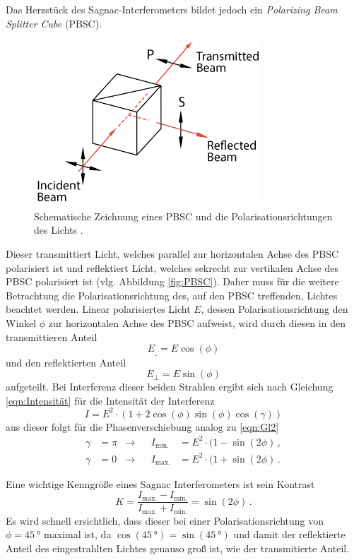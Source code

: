 Das Herzstück des Sagnac-Interferometers bildet jedoch ein \textit{Polarizing Beam Splitter Cube} (PBSC).
\begin{figure}
\includegraphics[width = .3\textwidth]{bilder/sketch-polarizing-cube-beamsplitter.png}
\caption{Schematische Zeichnung eines PBSC und die Polarisationsrichtungen des Lichts \cite{PBSC}.}
\end{figure}
Dieser transmittiert Licht, welches parallel zur horizontalen Achse des PBSC polarisiert ist und reflektiert Licht, welches sekrecht zur vertikalen Achse des PBSC polarisiert ist (vlg. Abbildung \ref{fig:PBSC}).
Daher muss für die weitere Betrachtung die Polarisationsrichtung des, auf den PBSC treffenden, Lichtes beachtet werden.
Linear polarisiertes Licht $E$, dessen Polarisationsrichtung den Winkel $\phi$ zur horizontalen Achse des PBSC aufweist, wird durch diesen in den transmittieren Anteil
\begin{equation*}
  E_{\_} = E \cos(\phi)
\end{equation*}
und den reflektierten Anteil
\begin{equation*}
  E_{\bot} = E \sin(\phi)
\end{equation*}
aufgeteilt.
\medskip
Bei Interferenz dieser beiden Strahlen ergibt sich nach Gleichung \eqref{eqn:Intensität} für die Intensität der Interferenz
\begin{equation*}
  I = E^2 \cdot (1 + 2 \cos(\phi) \sin(\phi) \cos(\gamma))
\end{equation*}
aus dieser folgt für die Phasenverschiebung analog zu \eqref{eqn:Gl2}
\begin{equation}  \label{eqn:Gl3}
  \begin{aligned}
  \gamma &= \pi &\rightarrow& &I_\text{min.} &= E^2 \cdot (1 − \sin(2\phi) \, , \\
  \gamma &= 0 &\rightarrow& &I_\text{max.} &= E^2 \cdot (1 + \sin(2\phi) \, .
\end{aligned}
\end{equation}

Eine wichtige Kenngröße eines Sagnac Interferometers ist sein Kontrast
\begin{equation}
  K = \frac{I_\text{max.} - I_\text{min.}}{I_\text{max.} + I_\text{min.}} = \sin(2\phi) \, .
  \label{eqn:Kontrast}
\end{equation}
Es wird schnell ersichtlich, dass dieser bei einer Polarisationsrichtung von $\phi = \SI{45}{\degree}$ maximal ist, da $\cos(\SI{45}{\degree}) = \sin(\SI{45}{\degree})$ und damit der reflektierte Anteil des eingestrahlten Lichtes genauso groß ist, wie der transmitierte Anteil.


